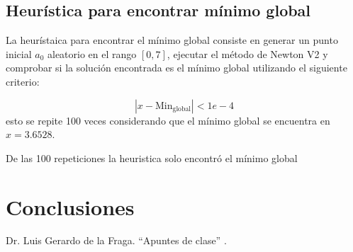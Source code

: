 \documentclass[conference]{IEEEtran}
\begin{document}
\subsection{Heurística para encontrar mínimo global}
La heurístaica para encontrar el mínimo global consiste en generar un punto inicial $a_{0}$ aleatorio en el rango $[0,7]$, ejecutar el método de Newton V2 y comprobar si la solución encontrada es el mínimo global utilizando el siguiente criterio:

\begin{equation}
	|x - \text{Min}_{\text{global}}| < 1e-4
\end{equation}
esto se repite 100 veces considerando que el mínimo global se encuentra en $x = 3.6528$.

De las 100 repeticiones la heuristica solo encontró el mínimo global 




\section{Conclusiones}



\begin{thebibliography}{00}
  Dr. Luis Gerardo de la Fraga. ``Apuntes de clase'' .
\end{thebibliography}
\end{document}

